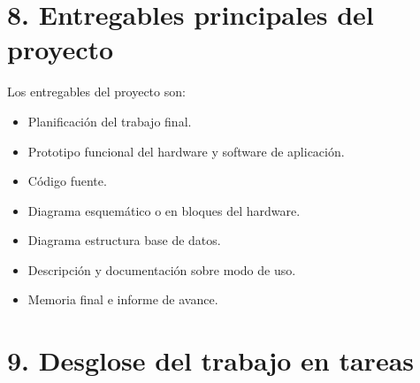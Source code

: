 \documentclass[
11pt, %
codirector, %
]{charter}
\begin{document}
\section{8. Entregables principales del proyecto}
\label{sec:entregables}

Los entregables del proyecto son:

\begin{itemize}
\item Planificación del trabajo final.
\item Prototipo funcional del hardware y software de aplicación.
\item Código fuente.
\item Diagrama esquemático o en bloques del hardware.
\item Diagrama estructura base de datos.
\item Descripción y documentación sobre modo de uso.
\item Memoria final e informe de avance.

\end{itemize}

\section{9. Desglose del trabajo en tareas}
\label{sec:wbs}
\end{document}
